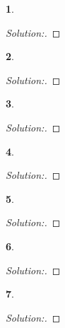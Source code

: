 \documentclass[10pt]{report}
\newtheorem{exe}{}[chapter]
\newenvironment{sol}{\begin{proof}[Solution:]}{\end{proof}}
\begin{document}
\begin{exe}

\end{exe}
\begin{teacher}
\begin{sol}
\end{sol}
\end{teacher}

\begin{exe}

\end{exe}
\begin{teacher}
\begin{sol}
\end{sol}
\end{teacher}

\begin{exe}

\end{exe}
\begin{teacher}
\begin{sol}
\end{sol}
\end{teacher}

\begin{exe}

\end{exe}
\begin{teacher}
\begin{sol}
\end{sol}
\end{teacher}

\begin{exe}

\end{exe}
\begin{teacher}
\begin{sol}
\end{sol}
\end{teacher}

\begin{exe}

\end{exe}
\begin{teacher}
\begin{sol}
\end{sol}
\end{teacher}

\begin{exe}

\end{exe}
\begin{teacher}
\begin{sol}
\end{sol}
\end{teacher}
\end{document}
